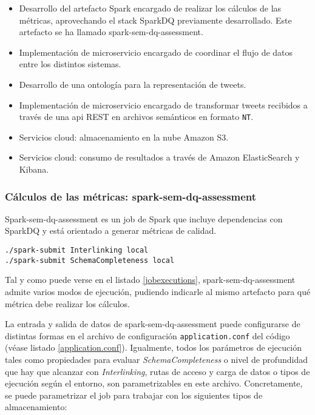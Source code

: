 \begin{itemize}
\item Desarrollo del artefacto Spark encargado de realizar los cálculos de las
  métricas, aprovechando el stack SparkDQ previamente desarrollado. Este
  artefacto se ha llamado spark-sem-dq-assessment. 
\item Implementación de microservicio encargado de coordinar el flujo de datos
  entre los distintos sistemas. 
\item Desarrollo de una ontología para la representación de tweets. 
\item Implementación de microservicio encargado de transformar tweets recibidos
 a través de una api REST en archivos semánticos en formato \texttt{NT}. 
\item Servicios cloud: almacenamiento en la nube Amazon S3. 
\item Servicios cloud: consumo de resultados a través de Amazon ElasticSearch y
  Kibana. 

\end{itemize}

\subsubsection{Cálculos de las métricas: spark-sem-dq-assessment}

Spark-sem-dq-assessment es un job de Spark que incluye dependencias con SparkDQ
y está orientado a generar métricas de calidad. 

\lstset{escapechar=@,language=bash}
\begin{lstlisting}[caption={Tipos de ejecución del job},captionpos=b,
    label=jobexecutions]
./spark-submit Interlinking local
./spark-submit SchemaCompleteness local
\end{lstlisting}

Tal y como puede verse en el listado \ref{jobexecutions},
spark-sem-dq-assessment admite varios modos de ejecución, pudiendo indicarle al
mismo artefacto para qué métrica debe realizar los cálculos. 

La entrada y salida de datos de spark-sem-dq-assessment puede configurarse
  de distintas formas en el archivo de configuración \texttt{application.conf}
  del código (véase listado \ref{application.conf}). Igualmente, todos los
  parámetros de ejecución tales como propiedades para evaluar
  \textit{SchemaCompleteness} o nivel de profundidad que hay que alcanzar con
  \textit{Interlinking}, rutas de acceso y carga de datos o tipos de ejecución
  según el entorno, son parametrizables en este archivo. Concretamente, se puede
  parametrizar el job para trabajar con los siguientes tipos de almacenamiento: 
 

